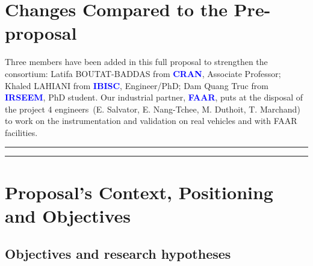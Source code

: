 \documentclass[a4paper,11pt]{article}
\begin{document}



\vspace{-0.8cm}


\section*{Changes Compared to the Pre-proposal}
{
\vspace{-0.2cm}
Three members have been added in this full proposal to strengthen the consortium: {Latifa {\sc BOUTAT-BADDAS} from \textcolor{blue}{\bf CRAN}, Associate Professor}; 
%
{Khaled {\sc LAHIANI} from \textcolor{blue}{\bf IBISC}, Engineer/PhD};
%
{Dam {\sc Quang Truc} from \textcolor{blue}{\bf IRSEEM}, PhD student}. Our industrial partner, \textcolor{blue}{\bf FAAR}, puts at the disposal of the project 4 engineers~(E. Salvator, E. Nang-Tchee, M. Duthoit, T. Marchand) to work on the instrumentation and validation on real vehicles and with FAAR facilities.
}



{
\small
\bigskip
\hrule
\setcounter{tocdepth}{2}
\tableofcontents
\bigskip
\hrule
}


\section{Proposal's Context, Positioning and Objectives}
%
%
\vspace{-0.3cm}
\subsection{Objectives and research hypotheses}
\vspace{-0.3cm}
\end{document}
